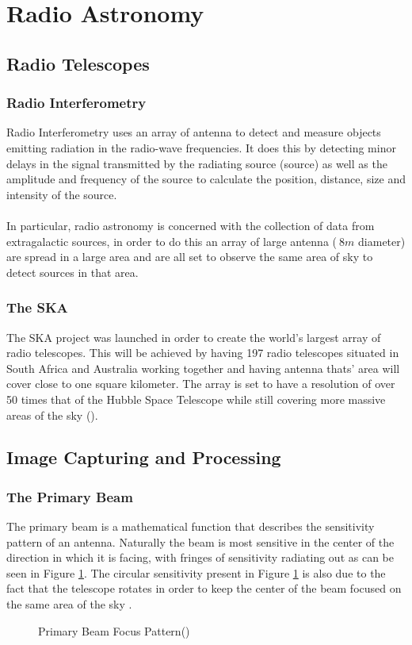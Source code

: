\section{Radio Astronomy}\label{ra}
\subsection{Radio Telescopes}\label{ra:sec:rt}
%
\subsubsection{Radio Interferometry}\label{ra:ssec:des}
Radio Interferometry uses an array of antenna to detect and measure objects emitting radiation in the radio-wave frequencies. It does this by detecting minor delays in the signal transmitted by the radiating source (source) as well as the amplitude and frequency of the source to calculate the position, distance, size and intensity of the source. 
\\
\\
In particular, radio astronomy is concerned with the collection of data from extragalactic sources, in order to do this an array of large antenna ($~8m$ diameter) are spread in a large area and are all set to observe the same area of sky to detect sources in that area.
%
\subsubsection{The SKA}
The SKA project was launched in order to create the world's largest array of radio telescopes. This will be achieved by having 197 radio telescopes situated in South Africa and Australia working together and having antenna thats' area will cover close to one square kilometer. The array is set to have a resolution of over 50 times that of the Hubble Space Telescope while still covering more massive areas of the sky (\cite{SKAsite}).
\subsection{Image Capturing and Processing}\label{ra:sec:ic}
%
\subsubsection{The Primary Beam}\label{ra:ssec:tpb}
The primary beam is a mathematical function that describes the sensitivity pattern of an antenna. Naturally the beam is most sensitive in the center of the direction in which it is facing, with fringes of sensitivity radiating out as can be seen in Figure \ref{ra:fig:beam}. The circular sensitivity present in Figure \ref{ra:fig:beam} is also due to the fact that the telescope rotates in order to keep the center of the beam focused on the same area of the sky \citep{oleg}.
%
\begin{figure}[H]
	\centering
	\label{ra:fig:beam}
	\caption{Primary Beam Focus Pattern(\cite{oleg})}
\end{figure}
%
